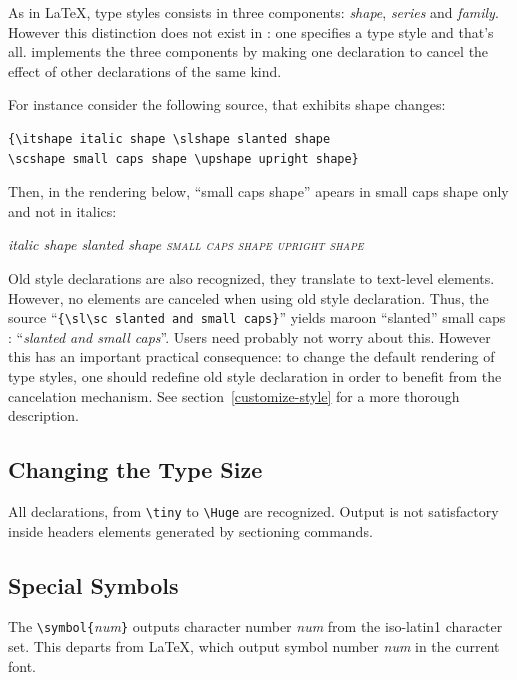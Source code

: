 As in \LaTeX{}, type styles consists in three components:
\emph{shape}, \emph{series} and \emph{family}.
However this distinction does not exist in \html: one specifies a
type style and that's all.
\hevea{} implements the three components by making one declaration to
cancel the effect of other declarations of the same kind.
\begin{htmlonly}
For instance consider the following source, that exhibits shape changes:
\begin{verbatim}
{\itshape italic shape \slshape slanted shape
\scshape small caps shape \upshape upright shape}
\end{verbatim}
Then, in the rendering below, ``small caps shape'' apears in small caps shape
only and not in italics:
\begin{htmlout}
{\itshape italic shape \slshape slanted shape
\scshape small caps shape \upshape upright shape}
\end{htmlout}
\end{htmlonly}


Old style declarations are also recognized, they translate to
text-level elements. However, no elements are canceled when using
old style declaration. Thus, the source
``\verb+{\sl\sc slanted and small caps}+'' yields maroon ``slanted'' small caps
\ifhevea: ``{\sl\sc slanted and small caps}''\fi.
Users need probably not worry about this. However this has an
important practical consequence: to change the default rendering of
type styles, one should redefine old style declaration in order to
benefit from the cancelation mechanism. See
section~\ref{customize-style} for a more thorough description.






\subsection{Changing the Type Size}
All declarations, from \verb+\tiny+ to \verb+\Huge+ are recognized.
Output is not satisfactory inside headers elements
generated by sectioning commands.

\subsection{Special Symbols}

The \verb+\symbol{+{\it num}\verb+}+ outputs character number {\it num}
from the iso-latin1 character set.
This departs from \LaTeX{}, which output symbol number \textit{num} in
the current font.

